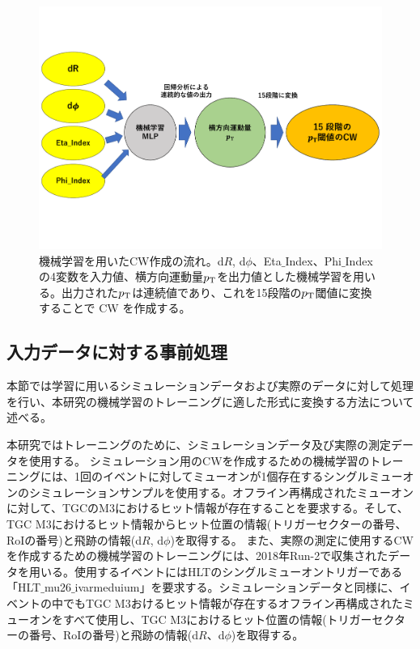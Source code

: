 \begin{figure}[tb]
  \centering
  \vspace{-3cm}
  \includegraphics[clip, width=15cm]{fig/4/MLPoverview2.pdf}
  \vspace{-2cm}
  \caption{機械学習を用いたCW作成の流れ。d$R$, d$\phi$、Eta$\_$Index、Phi$\_$Indexの4変数を入力値、横方向運動量$p_{\rm{T}}$を出力値とした機械学習を用いる。出力された$p_{\rm{T}}$は連続値であり、これを15段階の$p_{\rm{T}}$閾値に変換することで CW を作成する。}
  \label{fig:MLP_over}
\end{figure}

\subsection{入力データに対する事前処理}\label{事前処理}
本節では学習に用いるシミュレーションデータおよび実際のデータに対して処理を行い、本研究の機械学習のトレーニングに適した形式に変換する方法について述べる。

本研究ではトレーニングのために、シミュレーションデータ及び実際の測定データを使用する。
シミュレーション用のCWを作成するための機械学習のトレーニングには、1回のイベントに対してミューオンが1個存在するシングルミューオンのシミュレーションサンプルを使用する。オフライン再構成されたミューオンに対して、TGCのM3におけるヒット情報が存在することを要求する。そして、TGC M3におけるヒット情報からヒット位置の情報(トリガーセクターの番号、RoIの番号)と飛跡の情報(d$R$, d$\phi$)を取得する。
また、実際の測定に使用するCWを作成するための機械学習のトレーニングには、2018年Run-2で収集されたデータを用いる。使用するイベントにはHLTのシングルミューオントリガーである「HLT$\_$mu26$\_$ivarmeduium」を要求する。シミュレーションデータと同様に、イベントの中でもTGC M3おけるヒット情報が存在するオフライン再構成されたミューオンをすべて使用し、TGC M3におけるヒット位置の情報(トリガーセクターの番号、RoIの番号)と飛跡の情報(d$R$、d$\phi$)を取得する。

